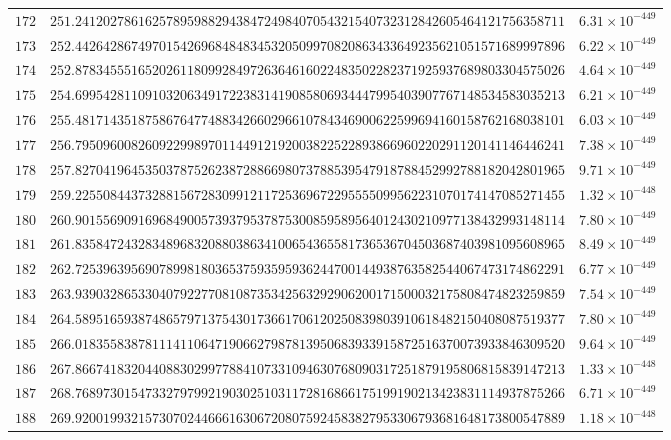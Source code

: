 \documentclass[12pt,reqno]{amsart}
\theoremstyle{remark}
\begin{document}
\begin{longtable}{clc}
$172$ & $251.2412027861625789598829438472498407054321540732312842605464121756358711$ & $6.31\times 10^{-449}$ \\
$173$ & $252.4426428674970154269684848345320509970820863433649235621051571689997896$ & $6.22\times 10^{-449}$ \\
$174$ & $252.8783455516520261180992849726364616022483502282371925937689803304575026$ & $4.64\times 10^{-449}$ \\
$175$ & $254.6995428110910320634917223831419085806934447995403907767148534583035213$ & $6.21\times 10^{-449}$ \\
$176$ & $255.4817143518758676477488342660296610784346900622599694160158762168038101$ & $6.03\times 10^{-449}$ \\
$177$ & $256.7950960082609229989701144912192003822522893866960220291120141146446241$ & $7.38\times 10^{-449}$ \\
$178$ & $257.8270419645350378752623872886698073788539547918788452992788182042801965$ & $9.71\times 10^{-449}$ \\
$179$ & $259.2255084437328815672830991211725369672295555099562231070174147085271455$ & $1.32\times 10^{-448}$ \\
$180$ & $260.9015569091696849005739379537875300859589564012430210977138432993148114$ & $7.80\times 10^{-449}$ \\
$181$ & $261.8358472432834896832088038634100654365581736536704503687403981095608965$ & $8.49\times 10^{-449}$ \\
$182$ & $262.7253963956907899818036537593595936244700144938763582544067473174862291$ & $6.77\times 10^{-449}$ \\
$183$ & $263.9390328653304079227708108735342563292906200171500032175808474823259859$ & $7.54\times 10^{-449}$ \\
$184$ & $264.5895165938748657971375430173661706120250839803910618482150408087519377$ & $7.80\times 10^{-449}$ \\
$185$ & $266.0183558387811141106471906627987813950683933915872516370073933846309520$ & $9.64\times 10^{-449}$ \\
$186$ & $267.8667418320440883029977884107331094630768090317251879195806815839147213$ & $1.33\times 10^{-448}$ \\
$187$ & $268.7689730154733279799219030251031172816866175199190213423831114937875266$ & $6.71\times 10^{-449}$ \\
$188$ & $269.9200199321573070244666163067208075924583827953306793681648173800547889$ & $1.18\times 10^{-448}$ \\

\end{longtable}
\end{document}

